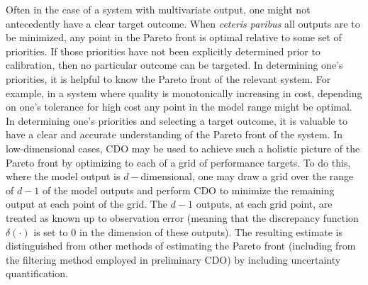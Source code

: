 \documentclass{article}
\begin{document}
Often in the case of a system with multivariate output, one might not antecedently have a clear target outcome.
%
When \textit{ceteris paribus} all outputs are to be minimized, any point in the Pareto front is optimal relative to some set of priorities.
%
If those priorities have not been explicitly determined prior to calibration, then no particular outcome can be targeted.
%
In determining one's priorities, it is helpful to know the Pareto front of the relevant system.
%
For example, in a system where quality is monotonically increasing in cost, depending on one's tolerance for high cost any point in the model range might be optimal.
%
In determining one's priorities and selecting a target outcome, it is valuable to have a clear and accurate understanding of the Pareto front of the system.
%
In low-dimensional cases, CDO may be used to achieve such a holistic picture of the Pareto front by optimizing to each of a grid of performance targets.
%
%
%
%
%
To do this, where the model output is $d-$dimensional, one may draw a grid over the range of $d-1$ of the model outputs and perform CDO to minimize the remaining output at each point of the grid.
%
The $d-1$ outputs, at each grid point, are treated as known up to observation error (meaning that the discrepancy function $\delta(\cdot)$ is set to 0 in the dimension of these outputs).
%
The resulting estimate is distinguished from other methods of estimating the Pareto front (including from the filtering method employed in preliminary CDO) by including uncertainty quantification.
%
\end{document}
